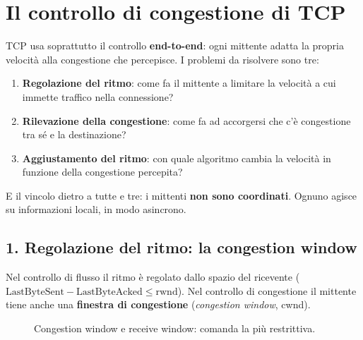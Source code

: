 \section{Il controllo di congestione di TCP}

TCP usa soprattutto il controllo \textbf{end-to-end}: ogni mittente adatta la propria velocità alla
congestione che percepisce. I problemi da risolvere sono tre:

\begin{enumerate}
    \item \textbf{Regolazione del ritmo}: come fa il mittente a limitare la velocità a cui immette traffico nella connessione?
    \item \textbf{Rilevazione della congestione}: come fa ad accorgersi che c'è congestione tra sé e la destinazione?
    \item \textbf{Aggiustamento del ritmo}: con quale algoritmo cambia la velocità in funzione della congestione percepita?
\end{enumerate}
E il vincolo dietro a tutte e tre: i mittenti \textbf{non sono coordinati}. Ognuno agisce su informazioni locali, in modo
asincrono.

\subsection{1. Regolazione del ritmo: la congestion window}

Nel controllo di flusso il ritmo è regolato dallo spazio del ricevente
($\text{LastByteSent} - \text{LastByteAcked} \leq \text{rwnd}$). Nel controllo di congestione il mittente
tiene anche una \textbf{finestra di congestione} (\emph{congestion window}, cwnd).


\begin{figure}[H]
\centering
{}
\caption{Congestion window e receive window: comanda la più restrittiva.}
\end{figure}

